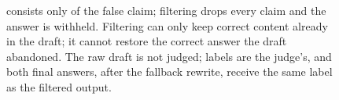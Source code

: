 \documentclass[sigconf, review, anonymous]{acmart}
\begin{document}
\begin{figure}[t]
{consists only of the false claim; filtering drops every claim and the
answer is withheld. Filtering can only keep correct content already in the
draft; it cannot restore the correct answer the draft abandoned. The raw
draft is not judged; labels are the judge's, and both final answers, after
the fallback rewrite, receive the same label as the filtered output.}
\label{fig:cases}
\end{figure}






\end{document}
